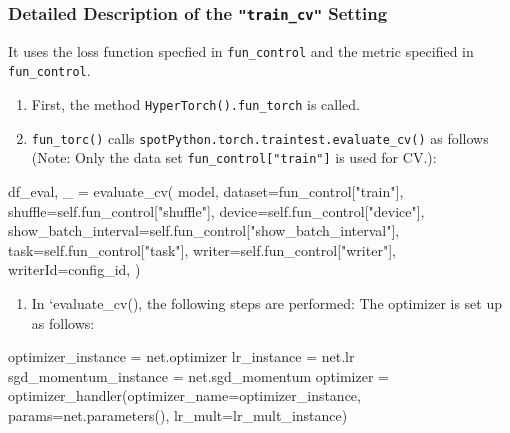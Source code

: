\documentclass[
  letterpaper,
  DIV=11,
  numbers=noendperiod]{scrreprt}
\newenvironment{Shaded}{\begin{snugshade}}{\end{snugshade}}
\newcommand{\NormalTok}[1]{\textcolor[rgb]{0.00,0.23,0.31}{#1}}
\providecommand{\tightlist}{%
  \setlength{\itemsep}{0pt}\setlength{\parskip}{0pt}}\usepackage{longtable,booktabs,array}
\begin{document}
\subsubsection{\texorpdfstring{Detailed Description of the
\texttt{"train\_cv"}
Setting}{Detailed Description of the "train\_cv" Setting}}\label{detailed-description-of-the-train_cv-setting}

It uses the loss function specfied in \texttt{fun\_control} and the
metric specified in \texttt{fun\_control}.

\begin{enumerate}
\def\labelenumi{\arabic{enumi}.}
\tightlist
\item
  First, the method \texttt{HyperTorch().fun\_torch} is called.
\item
  \texttt{fun\_torc()} calls
  \texttt{spotPython.torch.traintest.evaluate\_cv()} as follows (Note:
  Only the data set \texttt{fun\_control{[}"train"{]}} is used for CV.):
\end{enumerate}

\begin{Shaded}
\begin{Highlighting}[]
\NormalTok{df\_eval, \_ = evaluate\_cv(}
\NormalTok{    model,}
\NormalTok{    dataset=fun\_control["train"],}
\NormalTok{    shuffle=self.fun\_control["shuffle"],}
\NormalTok{    device=self.fun\_control["device"],}
\NormalTok{    show\_batch\_interval=self.fun\_control["show\_batch\_interval"],}
\NormalTok{    task=self.fun\_control["task"],}
\NormalTok{    writer=self.fun\_control["writer"],}
\NormalTok{    writerId=config\_id,}
\NormalTok{)}
\end{Highlighting}
\end{Shaded}

\begin{enumerate}
\def\labelenumi{\arabic{enumi}.}
\setcounter{enumi}{2}
\tightlist
\item
  In `evaluate\_cv(), the following steps are performed: The optimizer
  is set up as follows:
\end{enumerate}

\begin{Shaded}
\begin{Highlighting}[]
\NormalTok{optimizer\_instance = net.optimizer}
\NormalTok{lr\_instance = net.lr}
\NormalTok{sgd\_momentum\_instance = net.sgd\_momentum}
\NormalTok{optimizer = optimizer\_handler(optimizer\_name=optimizer\_instance,}
\NormalTok{     params=net.parameters(), lr\_mult=lr\_mult\_instance)}
\end{Highlighting}
\end{Shaded}
\end{document}
